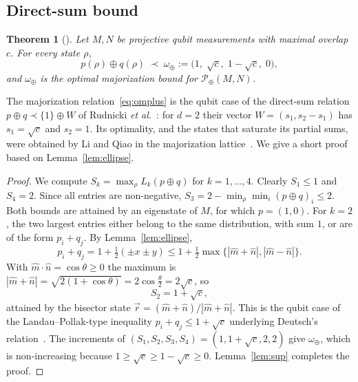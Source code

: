 \documentclass[aps,pra,twocolumn,superscriptaddress,nofootinbib,floatfix]{revtex4-2}
\newtheorem{theorem}{Theorem}
\theoremstyle{definition}
\newcommand{\vecr}{\vec r}
\newcommand{\mhat}{\hat m}
\newcommand{\nhat}{\hat n}
\newcommand{\maj}{\prec}
\newcommand{\omplus}{\omega_{\oplus}}
\newcommand{\sqc}{\sqrt{c}}
\newcommand{\Ach}{\mathcal{P}}
\begin{document}
\subsection{Direct-sum bound}

\begin{theorem}[\cite{RPZ2014,LiQiao2019}]
\label{thm:direct}
Let $M,N$ be projective qubit measurements with maximal overlap $c$. For every
state $\rho$,
\begin{equation}
  p(\rho)\oplus q(\rho)\;\maj\;\omplus:=\bigl(1,\;\sqc,\;1-\sqc,\;0\bigr),
  \label{eq:omplus}
\end{equation}
and $\omplus$ is the optimal majorization bound for $\Ach_\oplus(M,N)$.
\end{theorem}

The majorization relation~\eqref{eq:omplus} is the qubit case of the direct-sum
relation $p\oplus q\maj\{1\}\oplus W$ of Rudnicki \emph{et al.}~\cite{RPZ2014}:
for $d=2$ their vector $W=(s_1,s_2-s_1)$ has $s_1=\sqc$ and $s_2=1$. Its
optimality, and the states that saturate its partial sums, were obtained by Li
and Qiao in the majorization lattice~\cite{LiQiao2019}. We give a short proof
based on Lemma~\ref{lem:ellipse}.

\begin{proof}
We compute $S_k=\max_\rho L_k(p\oplus q)$ for $k=1,\dots,4$.
Clearly $S_1\le1$ and $S_4=2$. Since all entries are non-negative,
$S_3=2-\min_\rho\min_i(p\oplus q)_i\le2$.
Both bounds are attained by an eigenstate of $M$, for which $p=(1,0)$.
For $k=2$, the two largest entries either belong to the same distribution, with
sum $1$, or are of the form $p_i+q_j$. By Lemma~\ref{lem:ellipse},
\begin{equation}
  p_i+q_j=1+\tfrac12(\pm x\pm y)\le1+\tfrac12\max\{|\mhat+\nhat|,|\mhat-\nhat|\}.
\end{equation}
With $\mhat\cdot\nhat=\cos\theta\ge0$ the maximum is
$|\mhat+\nhat|=\sqrt{2(1+\cos\theta)}=2\cos\frac\theta2=2\sqc$, so
\begin{equation}
  S_2=1+\sqc ,
  \label{eq:S2}
\end{equation}
attained by the bisector state $\vecr=(\mhat+\nhat)/|\mhat+\nhat|$. This is the qubit case
of the Landau--Pollak-type inequality $p_i+q_j\le1+\sqc$ underlying Deutsch's
relation~\cite{LandauPollak1961,Deutsch1983}. The increments of $(S_1,S_2,S_3,S_4)=(1,1+\sqc,2,2)$
give $\omplus$, which is non-increasing because $1\ge\sqc\ge1-\sqc\ge0$.
Lemma~\ref{lem:sup} completes the proof.
\end{proof}
\end{document}
